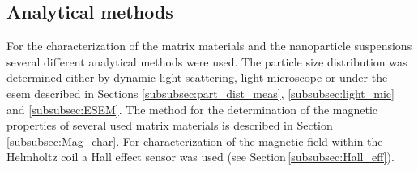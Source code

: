 

\subsection{Analytical methods}
\label{subsec:ana_met}
 For the characterization of the matrix materials and the nanoparticle suspensions several different analytical methods were used. The particle size distribution was determined either by dynamic light scattering, light microscope or under the \gls{esem} described in Sections \ref{subsubsec:part_dist_meas}, \ref{subsubsec:light_mic} and \ref{subsubsec:ESEM}. The method for the determination of the magnetic properties of several used matrix materials is described in Section\,\ref{subsubsec:Mag_char}. For characterization of the magnetic field within the Helmholtz coil a Hall effect sensor was used (see Section\,\ref{subsubsec:Hall_eff}).   
 
 
